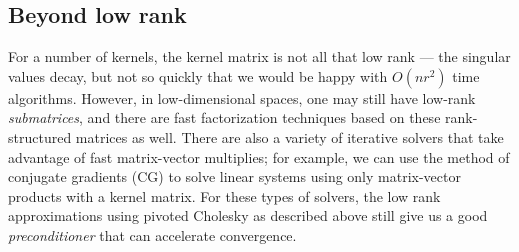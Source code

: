 \documentclass[12pt, leqno]{article} %
\begin{document}
\subsection{Beyond low rank}

For a number of kernels, the kernel matrix is not all that low rank
--- the singular values decay, but not so quickly that we would be
happy with $O(nr^2)$ time algorithms.  However, in low-dimensional
spaces, one may still have low-rank {\em submatrices}, and there are
fast factorization techniques based on these rank-structured matrices
as well.   There are also a variety of iterative solvers that take
advantage of fast matrix-vector multiplies; for example, we can use
the method of conjugate gradients (CG) to solve linear systems using
only matrix-vector products with a kernel matrix.  For these types of
solvers, the low rank approximations using pivoted Cholesky as
described above still give us a good {\em preconditioner} that can
accelerate convergence.
\end{document}
